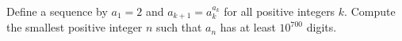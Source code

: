 Define a sequence by $a_1=2$ and $a_{k+1}=a_k^{a_k}$ for all positive integers $k$. Compute the smallest positive integer $n$ such that $a_n$ has at least $10^{700}$ digits.
